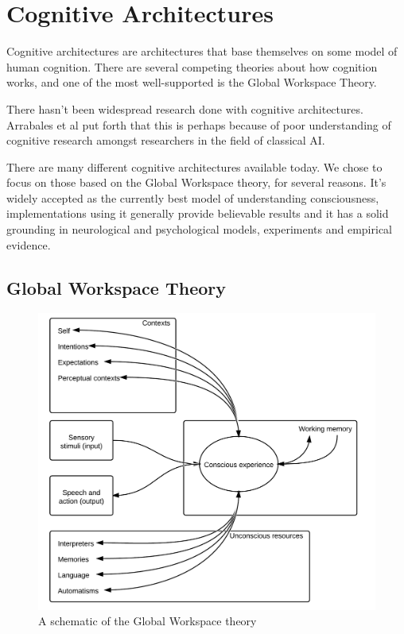\section{Cognitive Architectures}
\label{sec:cogarch}
Cognitive architectures are architectures that base themselves on some model of human cognition. There are several competing theories about how cognition works, and one of the most well-supported is the Global Workspace Theory.

There hasn't been widespread research done with cognitive architectures. Arrabales et al put forth that this is perhaps because of poor understanding of cognitive research amongst researchers in the field of classical AI. \cite{arrabales2009gamechars}

There are many different cognitive architectures available today\cite{duch2008cognitive}. We chose to focus on those based on the Global Workspace theory, for several reasons. It's widely accepted as the currently best model of understanding consciousness\cite{Franklin2012}, implementations using it generally provide believable results\cite{arrabales2009gamechars}\cite{snaider2011lida} and it has a solid grounding in neurological and psychological models, experiments and empirical evidence\cite{Franklin2012}.

\subsection{Global Workspace Theory}
\begin{figure}[h!tb]
\centering
\includegraphics[scale=1.0]{graphics/globalworkspace.png}
\caption{A schematic of the Global Workspace theory\cite{baars2005gwt}}
\label{fig:gwt}
\end{figure}

